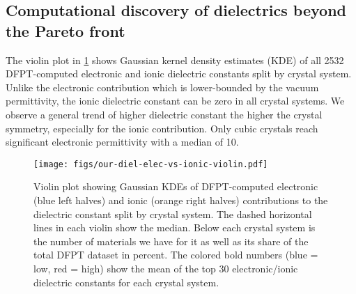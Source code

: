 \documentclass{article}
\begin{document}
\subsection{Computational discovery of dielectrics beyond the Pareto front}
\label{sec:computational-results}

The violin plot in \cref{fig:our-diel-elec-vs-ionic-violin} shows Gaussian kernel density estimates (KDE) of all \num{2532} DFPT-computed electronic and ionic dielectric constants split by crystal system.
Unlike the electronic contribution which is lower-bounded by the vacuum permittivity, the ionic dielectric constant can be zero in all crystal systems.
We observe a general trend of higher dielectric constant the higher the crystal symmetry, especially for the ionic contribution.
Only cubic crystals reach significant electronic permittivity with a median of 10.

\begin{figure}
    \centering
    \texttt{[image: figs/our-diel-elec-vs-ionic-violin.pdf]}
    \caption{
        Violin plot showing Gaussian KDEs of DFPT-computed electronic (blue left halves) and ionic (orange right halves) contributions to the dielectric constant split by crystal system.
        The dashed horizontal lines in each violin show the median.
        Below each crystal system is the number of materials we have for it as well as its share of the total DFPT dataset in percent.
        The colored bold numbers (blue = low, red = high) show the mean of the top 30 electronic/ionic dielectric constants for each crystal system.
    }
    \label{fig:our-diel-elec-vs-ionic-violin}
\end{figure}
\end{document}

